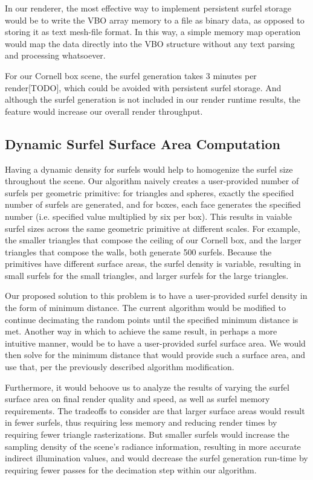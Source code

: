 In our renderer, the most effective way to implement persistent surfel storage would be to write the VBO array memory to a file as binary data, as opposed to storing it as text mesh-file format. In this way, a simple memory map operation would map the data directly into the VBO structure without any text parsing and processing whatsoever.

For our Cornell box scene, the surfel generation takes 3 minutes per render[TODO], which could be avoided with persistent surfel storage. And although the surfel generation is not included in our render runtime results, the feature would increase our overall render throughput.

\subsection{Dynamic Surfel Surface Area Computation}
Having a dynamic density for surfels would help to homogenize the surfel size throughout the scene. Our algorithm naively creates a user-provided number of surfels per geometric primitive: for triangles and spheres, exactly the specified number of surfels are generated, and for boxes, each face generates the specified number (i.e. specified value multiplied by six per box). This results in vaiable surfel sizes across the same geometric primitive at different scales. For example, the smaller triangles that compose the ceiling of our Cornell box, and the larger triangles that compose the walls, both generate 500 surfels. Because the primitives have different surface areas, the surfel density is variable, resulting in small surfels for the small triangles, and larger surfels for the large triangles.

Our proposed solution to this problem is to have a user-provided surfel density in the form of minimum distance. The current algorithm would be modified to continue decimating the random points until the specified minimum distance is met. Another way in which to achieve the same result, in perhaps a more intuitive manner, would be to have a user-provided surfel surface area. We would then solve for the minimum distance that would provide such a surface area, and use that, per the previously described algorithm modification.

Furthermore, it would behoove us to analyze the results of varying the surfel surface area on final render quality and speed, as well as surfel memory requirements. The tradeoffs to consider are that larger surface areas would result in fewer surfels, thus requiring less memory and reducing render times by requiring fewer triangle rasterizations. But smaller surfels would increase the sampling density of the scene's radiance information, resulting in more accurate indirect illumination values, and would decrease the surfel generation run-time by requiring fewer passes for the decimation step within our algorithm.

